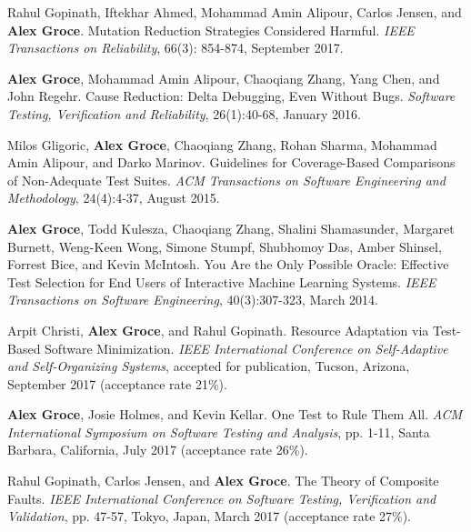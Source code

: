 \documentclass[ComputerScience,10pt]{vita}
\begin{document}
\begin{vita}
\begin{Selected Recent Journal Publications}
\item
Rahul Gopinath, Iftekhar Ahmed, Mohammad Amin Alipour, Carlos Jensen, and {\bf Alex Groce}.
\newblock Mutation Reduction Strategies Considered Harmful.
\newblock \emph{IEEE Transactions on Reliability}, 66(3): 854-874, September 2017.

\item
{\bf Alex Groce}, Mohammad Amin Alipour, Chaoqiang Zhang, Yang Chen, and John Regehr.
\newblock Cause Reduction: Delta Debugging, Even Without Bugs.
\newblock \emph{Software Testing, Verification and Reliability}, 26(1):40-68, January 2016.

\item
Milos Gligoric, {\bf Alex Groce}, Chaoqiang Zhang, Rohan Sharma, Mohammad Amin Alipour, and Darko Marinov.
\newblock Guidelines for Coverage-Based Comparisons of Non-Adequate Test Suites.
\newblock \emph{ACM Transactions on Software Engineering and Methodology}, 24(4):4-37, August 2015.

\item
{\bf Alex Groce}, Todd Kulesza, Chaoqiang Zhang, Shalini Shamasunder, Margaret Burnett, Weng-Keen Wong, Simone Stumpf, Shubhomoy Das, Amber Shinsel, Forrest Bice, and Kevin McIntosh.
\newblock You Are the Only Possible Oracle: Effective Test Selection for End Users of Interactive Machine Learning Systems.
\newblock \emph{IEEE Transactions on Software Engineering}, 40(3):307-323, March 2014.
\end{Selected Recent Journal Publications}

\begin{Selected Recent Conference Publications}
\item Arpit Christi, {\bf Alex Groce}, and Rahul Gopinath.
\newblock Resource Adaptation via Test-Based Software Minimization.
\newblock \emph{IEEE International Conference on Self-Adaptive and Self-Organizing Systems}, accepted for publication, Tucson, Arizona, September 2017 (acceptance rate 21\%).

\item {\bf Alex Groce}, Josie Holmes, and Kevin Kellar.
\newblock One Test to Rule Them All.
\newblock \emph{ACM International Symposium on Software Testing and Analysis}, pp. 1-11, Santa Barbara, California, July 2017 (acceptance rate 26\%).

\item Rahul Gopinath, Carlos Jensen, and {\bf Alex Groce}.
\newblock The Theory of Composite Faults.
\newblock \emph{IEEE International Conference on Software Testing, Verification and Validation}, pp. 47-57, Tokyo, Japan, March 2017 (acceptance rate 27\%).


\end{Selected Recent Conference Publications}
\end{vita}
\end{document}
